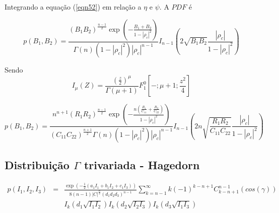 Integrando a equação (\ref{eqn52}) em relação a $\eta$ e $\psi$. A $PDF$ é

\begin{equation}\label{eqn60}
	p(B_1,B_2)=\frac{\left(B_1B_2\right)^{\frac{n-1}{2}}\exp\left(-\frac{B_1+B_2}{1-|\rho_c|^2}\right)}{\Gamma(n)(1-|\rho_c|^2)|\rho_c|^{n-1}}I_{n-1}\left(2\sqrt{B_1B_2}\frac{|\rho_c|}{1-|\rho_c|^2}\right)
\end{equation}

Sendo
\begin{equation}\label{eqn61}
	I_{\mu}(Z)=\frac{(\frac{z}{2})^{\mu}}{\Gamma(\mu+1)} F_{1}^{0}[-;\mu+1;\frac{z^2}{4}]
\end{equation}

\begin{equation}\label{eqn62}
	p(B_1,B_2)=\frac{n^{n+1}\left(R_1R_2\right)^{\frac{n-1}{2}}\exp\left(-\frac{n(\frac{R_1}{C_{11}}+\frac{R_2}{C_{22}})}{1-|\rho_c|^2}\right)}{(C_{11}C_{22})^{\frac{n+1}{2}}\Gamma(n)(1-|\rho_c|^2)|\rho_c|^{n-1}}I_{n-1}\left(2n\sqrt{\frac{R_1R_2}{C_{11}C_{22}}}\frac{|\rho_c|}{1-|\rho_c|^2}\right)
\end{equation}
\subsection{Distribuição $\Gamma$ trivariada - Hagedorn }
\begin{equation}\label{eqn62}
\begin{array}{ccc}
	p(I_1,I_2,I_3)&=& \frac{\exp(-\frac{1}{2}(a_1I_1+b_1I_2+c_1I_3))}{8(n-1)|C|^{\frac{n}{2}}(d_1d_2d_3)^{n-1}}\sum_{k=n-1}^{\infty}k(-1)^{k-n+1}C_{k-n+1}^{n-1}(cos(\gamma))\\
	&&I_k(d_1\sqrt{I_1I_2})I_k(d_2\sqrt{I_2I_3})I_k(d_3\sqrt{I_1I_3})
\end{array}
\end{equation}




